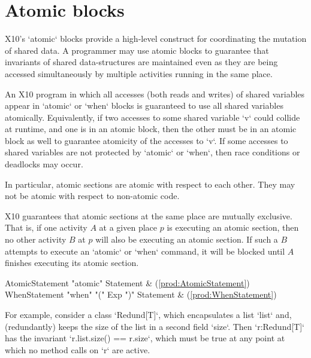 \section{Atomic blocks}\label{AtomicBlocks}

X10's \xcd`atomic` blocks provide a high-level construct for coordinating
the mutation of shared data. 
A programmer may use atomic blocks to guarantee that invariants of
shared data-structures are maintained even as they are being accessed
simultaneously by multiple activities running in the same place.  

An X10 program in which all accesses (both reads and writes) of shared
variables appear in \xcd`atomic` or \xcd`when` blocks is guaranteed to use all
shared variables atomically.  Equivalently, 
if two accesses to some shared variable \xcd`v` could collide at runtime, and
one is in an atomic block, then the other must be in an atomic block as well
to guarantee atomicity of the accesses to \xcd`v`. 
If some accesses to shared variables are not
protected by \xcd`atomic` or \xcd`when`, then race conditions or deadlocks may
occur.  

In particular, atomic sections are atomic with respect to each other. They may
not be atomic with respect to non-atomic code.  

X10 guarantees that atomic sections at the same place are mutually exclusive.
That is, if one activity $A$ at a given place $p$ is executing an atomic
section, then no other activity $B$ at $p$ will also be executing an atomic
section. If such a $B$ attempts to execute an \xcd`atomic` or \xcd`when`
command, it will be blocked until $A$ finishes executing its atomic section.  



\begin{bbgrammar}
     AtomicStatement \: \xcd"atomic" Statement & (\ref{prod:AtomicStatement}) \\
       WhenStatement \: \xcd"when" \xcd"(" Exp \xcd")" Statement & (\ref{prod:WhenStatement}) \\
\end{bbgrammar}

For example, consider a class \xcd`Redund[T]`, which encapsulates a list
\xcd`list` and, (redundantly) keeps the size of the list in a second field
\xcd`size`.  Then \xcd`r:Redund[T]` has the invariant 
\xcd`r.list.size() == r.size`, which must be true at any point at which
no method calls on \xcd`r` are active.

